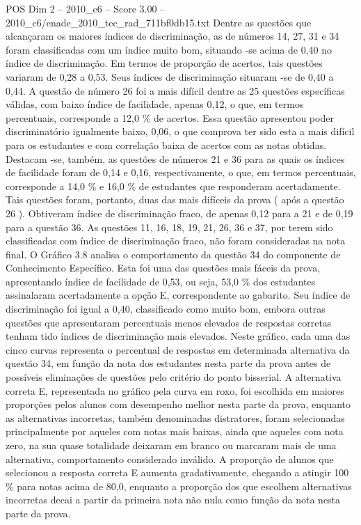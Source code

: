 \begin{textsample}{POS Dim 2 – 2010\_c6 – Score 3.00 – 2010\_c6/enade\_2010\_tec\_rad\_711bf0db15.txt}
Dentre as questões que alcançaram os maiores índices de discriminação, as de números 14, 27, 31 e 34 foram classificadas com um índice muito bom, situando -se acima de 0,40 no índice de discriminação.
Em termos de proporção de acertos, tais questões variaram de 0,28 a 0,53.
Seus índices de discriminação situaram -se de 0,40 a 0,44.
A questão de número 26 foi a mais difícil dentre as 25 questões específicas válidas, com baixo índice de facilidade, apenas 0,12, o que, em termos percentuais, corresponde a 12,0 \% de acertos.
Essa questão apresentou poder discriminatório igualmente baixo, 0,06, o que comprova ter sido esta a mais difícil para os estudantes e com correlação baixa de acertos com as notas obtidas.
Destacam -se, também, as questões de números 21 e 36 para as quais os índices de facilidade foram de 0,14 e 0,16, respectivamente, o que, em termos percentuais, corresponde a 14,0 \% e 16,0 \% de estudantes que responderam acertadamente.
Tais questões foram, portanto, duas das mais difíceis da prova ( após a questão 26 ).
Obtiveram índice de discriminação fraco, de apenas 0,12 para a 21 e de 0,19 para a questão 36.
As questões 11, 16, 18, 19, 21, 26, 36 e 37, por terem sido classificadas com índice de discriminação fraco, não foram consideradas na nota final.
O Gráfico 3.8 analisa o comportamento da questão 34 do componente de Conhecimento Específico.
Esta foi uma das questões mais fáceis da prova, apresentando índice de facilidade de 0,53, ou seja, 53,0 \% dos estudantes assinalaram acertadamente a opção E, correspondente ao gabarito.
Seu índice de discriminação foi igual a 0,40, classificado como muito bom, embora outras questões que apresentaram percentuais menos elevados de respostas corretas tenham tido índices de discriminação mais elevados.
Neste gráfico, cada uma das cinco curvas representa o percentual de respostas em determinada alternativa da questão 34, em função da nota dos estudantes nesta parte da prova antes de possíveis eliminações de questões pelo critério do ponto bisserial.
A alternativa correta E, representada no gráfico pela curva em roxo, foi escolhida em maiores proporções pelos alunos com desempenho melhor nesta parte da prova, enquanto as alternativas incorretas, também denominadas distratores, foram selecionadas principalmente por aqueles com notas mais baixas, ainda que aqueles com nota zero, na sua quase totalidade deixaram em branco ou marcaram mais de uma alternativa, comportamento considerado inválido.
A proporção de alunos que selecionou a resposta correta E aumenta gradativamente, chegando a atingir 100 \% para notas acima de 80,0, enquanto a proporção dos que escolhem alternativas incorretas decai a partir da primeira nota não nula como função da nota nesta parte da prova.

\end{textsample}
